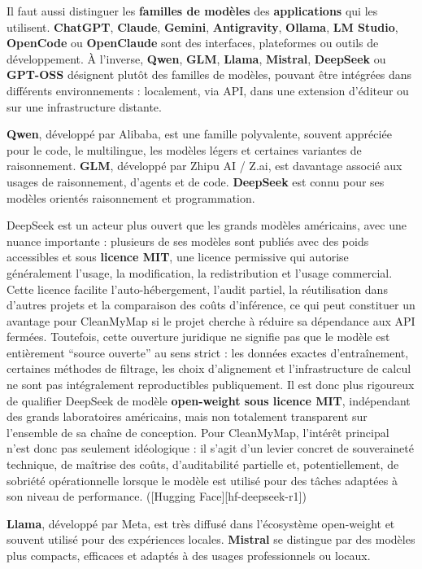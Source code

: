 \documentclass[
  10pt,
  a4paper,
  DIV=11,
  numbers=noendperiod,
  oneside]{scrreprt}
\let\oldtextbf\textbf
\renewcommand{\textbf}[1]{\oldtextbf{\textcolor{cmmnavy}{#1}}}
\begin{document}
Il faut aussi distinguer les \textbf{familles de modèles} des
\textbf{applications} qui les utilisent. \textbf{ChatGPT},
\textbf{Claude}, \textbf{Gemini}, \textbf{Antigravity}, \textbf{Ollama},
\textbf{LM Studio}, \textbf{OpenCode} ou \textbf{OpenClaude} sont des
interfaces, plateformes ou outils de développement. À l'inverse,
\textbf{Qwen}, \textbf{GLM}, \textbf{Llama}, \textbf{Mistral},
\textbf{DeepSeek} ou \textbf{GPT-OSS} désignent plutôt des familles de
modèles, pouvant être intégrées dans différents environnements :
localement, via API, dans une extension d'éditeur ou sur une
infrastructure distante.

\textbf{Qwen}, développé par Alibaba, est une famille polyvalente,
souvent appréciée pour le code, le multilingue, les modèles légers et
certaines variantes de raisonnement. \textbf{GLM}, développé par Zhipu
AI / Z.ai, est davantage associé aux usages de raisonnement, d'agents et
de code. \textbf{DeepSeek} est connu pour ses modèles orientés
raisonnement et programmation.

DeepSeek est un acteur plus ouvert que les grands modèles américains,
avec une nuance importante : plusieurs de ses modèles sont publiés avec
des poids accessibles et sous \textbf{licence MIT}, une licence
permissive qui autorise généralement l'usage, la modification, la
redistribution et l'usage commercial. Cette licence facilite
l'auto-hébergement, l'audit partiel, la réutilisation dans d'autres
projets et la comparaison des coûts d'inférence, ce qui peut constituer
un avantage pour CleanMyMap si le projet cherche à réduire sa dépendance
aux API fermées. Toutefois, cette ouverture juridique ne signifie pas
que le modèle est entièrement ``source ouverte'' au sens strict : les
données exactes d'entraînement, certaines méthodes de filtrage, les
choix d'alignement et l'infrastructure de calcul ne sont pas
intégralement reproductibles publiquement. Il est donc plus rigoureux de
qualifier DeepSeek de modèle \textbf{open-weight sous licence MIT},
indépendant des grands laboratoires américains, mais non totalement
transparent sur l'ensemble de sa chaîne de conception. Pour CleanMyMap,
l'intérêt principal n'est donc pas seulement idéologique : il s'agit
d'un levier concret de souveraineté technique, de maîtrise des coûts,
d'auditabilité partielle et, potentiellement, de sobriété opérationnelle
lorsque le modèle est utilisé pour des tâches adaptées à son niveau de
performance. ({[}Hugging Face{]}{[}hf-deepseek-r1{]})

\textbf{Llama}, développé par Meta, est très diffusé dans l'écosystème
open-weight et souvent utilisé pour des expériences locales.
\textbf{Mistral} se distingue par des modèles plus compacts, efficaces
et adaptés à des usages professionnels ou locaux.
\end{document}
